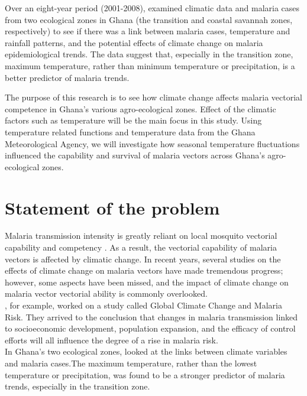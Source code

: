  \noindent Over an eight-year period (2001-2008), \cite{klutse2014assessment} examined climatic data and malaria cases from two ecological zones in Ghana (the transition and coastal savannah zones, respectively) to see if there was a link between malaria cases, temperature and rainfall patterns, and the potential effects of climate change on malaria epidemiological trends. The data suggest that, especially in the transition zone, maximum temperature, rather than minimum temperature or precipitation, is a better predictor of malaria trends.

\newpage
\noindent The purpose of this research is to see how climate change affects malaria vectorial competence in Ghana's various agro-ecological zones. Effect of the climatic factors such as temperature will be the main focus in this study. Using temperature related functions and temperature data from the Ghana Meteorological Agency, we will investigate how seasonal temperature fluctuations influenced the capability and survival of malaria vectors across Ghana's agro-ecological zones. 

\section{Statement of the problem}
Malaria transmission intensity is greatly reliant on local mosquito vectorial capability and competency \citep{cohuet2010evolutionary}. As a result, the vectorial capability of malaria vectors is affected by climatic change. In recent years, several studies on the effects of climate change on malaria vectors have made tremendous progress; however, some aspects have been missed, and the impact of climate change on malaria vector vectorial ability is commonly overlooked.\\

\noindent \cite{martens1995potential}, for example, worked on a study called Global Climate Change and Malaria Risk. They arrived to the conclusion that changes in malaria transmission linked to socioeconomic development, population expansion, and the efficacy of control efforts will all influence the degree of a rise in malaria risk.\\

 \noindent In Ghana's two ecological zones, \cite{klutse2014assessment} looked at the links between climate variables and malaria cases.The maximum temperature, rather than the lowest temperature or precipitation, was found to be a stronger predictor of malaria trends, especially in the transition zone.

